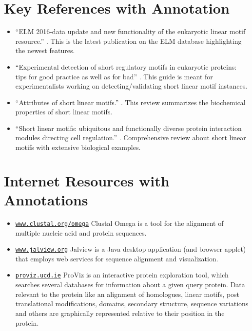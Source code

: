 \documentclass[12pt]{article}
\newcommand\rurl[1]{%
	\href{http://#1}{\nolinkurl{#1}}%
}
\begin{document}
%
%
\section*{Key References with Annotation}
\label{sec:key-references-with-annotation}

\begin{itemize}
\item ``ELM 2016-data update and new functionality of the
	eukaryotic linear motif resource.'' \citep{26615199}.
	This is the latest publication on the ELM database highlighting the
	newest features.

\item ``Experimental detection of short regulatory motifs in eukaryotic proteins: tips
	for good practice as well as for bad'' \citep{26581338}.
	This guide is meant for experimentalists working on detecting/validating short
	linear motif instances.

\item ``Attributes of short linear motifs.'' \citep{21909575}.
	This review summarizes the biochemical properties of short linear
	motifs.

\item ``Short linear motifs: ubiquitous and functionally diverse protein
    interaction modules directing cell regulation.'' \citep{24926813}.
	Comprehensive review about short linear motifs with extensive biological
	examples.

\end{itemize}


\section*{Internet Resources with Annotations}%
\label{sec:internet-resources-with-annotations}

\begin{itemize}

\item \rurl{www.clustal.org/omega} Clustal Omega \citep{21988835} is a tool
for the alignment of multiple nucleic acid and protein sequences.

\item \rurl{www.jalview.org} Jalview \citep{19151095} is a Java desktop
application (and browser applet) that employs web services for sequence
alignment and visualization.

\item \rurl{proviz.ucd.ie} ProViz \citep{27085803} is an interactive protein
exploration tool, which searches several databases for information about
a given query protein. Data relevant to the protein like an alignment of
homologues, linear motifs, post translational modifications, domains,
secondary structure, sequence variations and others are graphically
represented relative to their position in the protein.

\end{itemize}



\end{document}
